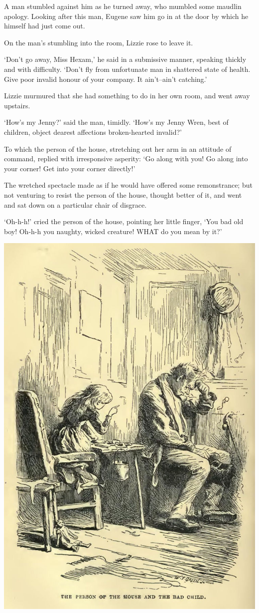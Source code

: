 A man stumbled against him as he turned away, who mumbled some maudlin
apology. Looking after this man, Eugene saw him go in at the door by
which he himself had just come out.

On the man’s stumbling into the room, Lizzie rose to leave it.

‘Don’t go away, Miss Hexam,’ he said in a submissive manner, speaking
thickly and with difficulty. ‘Don’t fly from unfortunate man in
shattered state of health. Give poor invalid honour of your company. It
ain’t--ain’t catching.’

Lizzie murmured that she had something to do in her own room, and went
away upstairs.

‘How’s my Jenny?’ said the man, timidly. ‘How’s my Jenny Wren, best of
children, object dearest affections broken-hearted invalid?’

To which the person of the house, stretching out her arm in an attitude
of command, replied with irresponsive asperity: ‘Go along with you! Go
along into your corner! Get into your corner directly!’

The wretched spectacle made as if he would have offered some
remonstrance; but not venturing to resist the person of the house,
thought better of it, and went and sat down on a particular chair of
disgrace.

‘Oh-h-h!’ cried the person of the house, pointing her little finger,
‘You bad old boy! Oh-h-h you naughty, wicked creature! WHAT do you mean
by it?’

\includegraphics[scale=2.3]{02-02-01}

